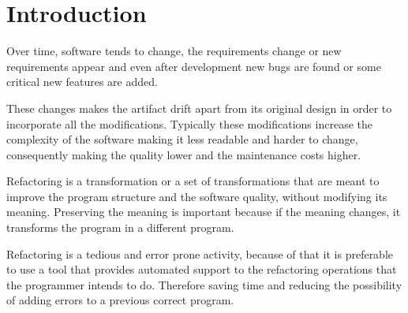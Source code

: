 
% 
% 

\section{Introduction}


Over time, software tends to change, the requirements change or new requirements appear and even after development new bugs are found or some critical new features are added.

These changes makes the artifact drift apart from its original design in order to incorporate all the modifications.
Typically these modifications increase the complexity of the software making it less readable and harder to change, consequently making the quality lower and the maintenance costs higher. %

Refactoring is a transformation or a set of transformations that are meant to improve the program structure and the software quality\cite{bourquin2007high},  without modifying its meaning. 
Preserving the meaning is important because if the meaning changes, it transforms the program in a different program.


Refactoring is a tedious and error prone activity, because of that it is preferable to use a tool that provides automated support to the refactoring operations that the programmer intends to do. 
Therefore saving time and reducing the possibility of adding errors to a previous correct program.

